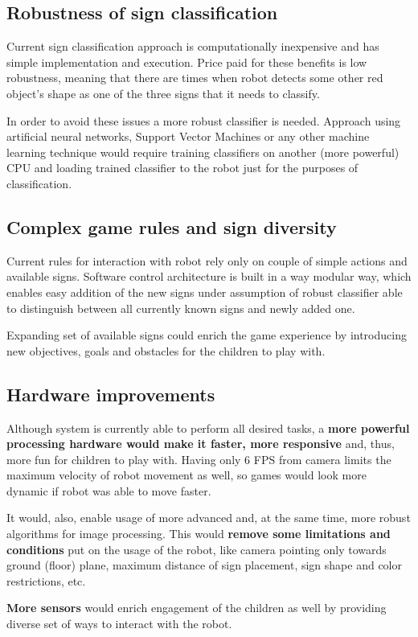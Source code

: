 
\subsection{Robustness of sign classification}

Current sign classification approach is computationally inexpensive and has simple implementation and execution. Price paid for these benefits is low robustness, meaning that there are times when robot detects some other red object's shape as one of the three signs that it needs to classify.

In order to avoid these issues a more robust classifier is needed. Approach using artificial neural networks, Support Vector Machines or any other machine learning technique would require training classifiers on another (more powerful) CPU and loading trained classifier to the robot just for the purposes of classification.

\subsection{Complex game rules and sign diversity}

Current rules for interaction with robot rely only on couple of simple actions and available signs. Software control architecture is built in a way modular way, which enables easy addition of the new signs under assumption of robust classifier able to distinguish between all currently known signs and newly added one.

Expanding set of available signs could enrich the game experience by introducing new objectives, goals and obstacles for the children to play with.

\subsection{Hardware improvements}

Although system is currently able to perform all desired tasks, a \textbf{more powerful processing hardware would make it faster, more responsive} and, thus, more fun for children to play with. Having only 6 FPS from camera limits the maximum velocity of robot movement as well, so games would look more dynamic if robot was able to move faster. 

It would, also, enable usage of more advanced and, at the same time, more robust algorithms for image processing. This would \textbf{remove some limitations and conditions} put on the usage of the robot, like camera pointing only towards ground (floor) plane, maximum distance of sign placement, sign shape and color restrictions, etc.

\textbf{More sensors} would enrich engagement of the children as well by providing diverse set of ways to interact with the robot. 


